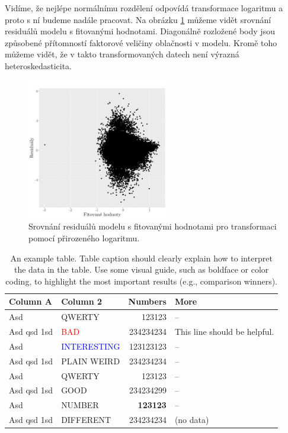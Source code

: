 Vidíme, že nejlépe normálnímu rozdělení odpovídá transformace logaritmu a proto s ní budeme nadále pracovat. Na obrázku \ref{fig:resvsfit_log} můžeme vidět srovnání residuálů modelu s fitovanými hodnotami. Diagonálně rozložené body jsou způsobené přítomností faktorové veličiny oblačnosti v modelu. Kromě toho můžeme vidět, že v takto transformovaných datech není výrazná heteroskedasticita.

\begin{figure}
	\centering
  \includegraphics[width=0.55\textwidth]{img/ch2/modmax15cm_log.png}
	\caption{Srovnání residuálů modelu s fitovanými hodnotami pro transformaci pomocí přirozeného logaritmu.}
	\label{fig:resvsfit_log}
\end{figure}



\begin{table}
\centering\footnotesize\sf
\begin{tabular}{llrl}
\toprule
Column A & Column 2 & Numbers & More \\
\midrule
Asd & QWERTY & 123123 & -- \\
Asd qsd 1sd & \textcolor{red}{BAD} & 234234234 & This line should be helpful. \\
Asd & \textcolor{blue}{INTERESTING} & 123123123 & -- \\
Asd qsd 1sd & \textcolor{violet!50}{PLAIN WEIRD} & 234234234 & -- \\
Asd & QWERTY & 123123 & -- \\
\addlinespace %
Asd qsd 1sd & \textcolor{green!80!black}{GOOD} & 234234299 & -- \\
Asd & NUMBER & \textbf{123123} & -- \\
Asd qsd 1sd & DIFFERENT & 234234234 & (no data) \\
\bottomrule
\end{tabular}
\caption{An example table.  Table caption should clearly explain how to interpret the data in the table. Use some visual guide, such as boldface or color coding, to highlight the most important results (e.g., comparison winners).}
\label{tab:z}
\end{table}

